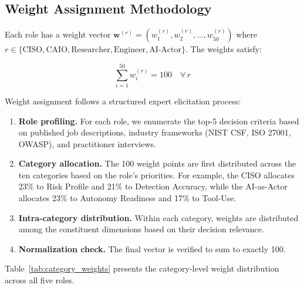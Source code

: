 \documentclass[10pt,twocolumn]{article}
\begin{document}
\subsection{Weight Assignment Methodology}
\label{sec:weights}

Each role has a weight vector $\mathbf{w}^{(r)} = (w_1^{(r)}, w_2^{(r)}, \ldots, w_{50}^{(r)})$ where $r \in \{\text{CISO}, \text{CAIO}, \text{Researcher}, \text{Engineer}, \text{AI-Actor}\}$. The weights satisfy:

\begin{equation}
\sum_{i=1}^{50} w_i^{(r)} = 100 \quad \forall \, r
\label{eq:weight_constraint}
\end{equation}

Weight assignment follows a structured expert elicitation process:

\begin{enumerate}[noitemsep,topsep=2pt]
    \item \textbf{Role profiling.} For each role, we enumerate the top-5 decision criteria based on published job descriptions, industry frameworks (NIST CSF, ISO 27001, OWASP), and practitioner interviews.
    \item \textbf{Category allocation.} The 100 weight points are first distributed across the ten categories based on the role's priorities. For example, the CISO allocates 23\% to Risk Profile and 21\% to Detection Accuracy, while the AI-as-Actor allocates 23\% to Autonomy Readiness and 17\% to Tool-Use.
    \item \textbf{Intra-category distribution.} Within each category, weights are distributed among the constituent dimensions based on their decision relevance.
    \item \textbf{Normalization check.} The final vector is verified to sum to exactly 100.
\end{enumerate}

Table~\ref{tab:category_weights} presents the category-level weight distribution across all five roles.
\end{document}
